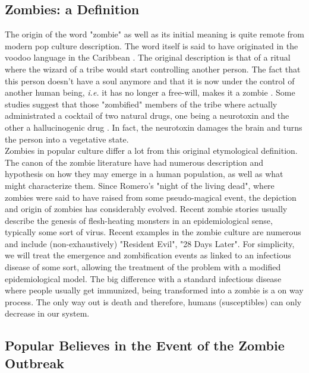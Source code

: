 \documentclass[11pt]{article} %
\begin{document}
\subsection{Zombies: a Definition}\indent

The origin of the word "zombie" as well as its initial meaning is quite remote from modern pop culture description. The word itself is said to have originated in the voodoo language in the Caribbean \cite{munz2009zombies}. The original description is that of a ritual where the wizard of a tribe would start controlling another person. The fact that this person doesn't have a soul anymore and that it is now under the control of another human being, \textit{i.e.} it has no longer a free-will, makes it a zombie \cite{munz2009zombies}. Some studies suggest that those "zombified" members of the tribe where actually administrated a cocktail of two natural drugs, one being a neurotoxin and the other a hallucinogenic drug \cite{littlewood1997clinical}. In fact, the neurotoxin damages the brain and turns the person into a vegetative state.\\



Zombies in popular culture differ a lot from this original etymological definition. The canon of the zombie literature have had numerous description and hypothesis on how they may emerge in a human population, as well as what might characterize them. Since Romero's "night of the living dead", where zombies were said to have raised from some pseudo-magical event, the depiction and origin of zombies has considerably evolved. Recent zombie stories usually describe the genesis of flesh-heating monsters in an epidemiological sense, typically some sort of virus. Recent examples in the zombie culture are numerous and include (non-exhaustively) "Resident Evil", "28 Days Later". For simplicity, we will treat the emergence and zombification events as linked to an infectious disease of some sort, allowing the treatment of the problem with a modified epidemiological model. The big difference with a standard infectious disease where people usually get immunized, being transformed into a zombie is a on way process. The only way out is death and therefore, humans (susceptibles) can only decrease in our system.\\


\subsection{Popular Believes in the Event of the Zombie Outbreak}\indent
\end{document}
